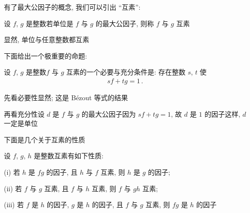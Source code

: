 有了最大公因子的概念, 我们可以引出 ``互素'':
\begin{definition}
    设 $f$, $g$ 是整数\period 若单位是 $f$ 与 $g$ 的最大公因子, 则称 $f$ 与 $g$ 互素 \period
\end{definition}

\begin{example}
    显然, 单位与任意整数都互素\period
\end{example}

下面给出一个极重要的命题:
\begin{proposition}
    设 $f$, $g$ 是整数\period $f$ 与 $g$ 互素的一个必要与充分条件是: 存在整数 $s$, $t$ 使
    \begin{align*}
        sf + tg = 1 \period
    \end{align*}
\end{proposition}

\begin{pf}
    先看必要性\period 显然; 这是 Bézout 等式的结果\period

    再看充分性\period 设 $d$ 是 $f$ 与 $g$ 的最大公因子\period 因为 $sf + tg = 1$, 故 $d$ 是 $1$ 的因子\period 这样, $d$ 一定是单位\period
\end{pf}

下面是几个关于互素的性质\period

\begin{proposition}
    设 $f$, $g$, $h$ 是整数\period 互素有如下性质:

    (i) 若 $h$ 是 $fg$ 的因子, 且 $h$ 与 $f$ 互素, 则 $h$ 是 $g$ 的因子;

    (ii) 若 $f$ 与 $g$ 互素, 且 $f$ 与 $h$ 互素, 则 $f$ 与 $gh$ 互素;

    (iii) 若 $f$ 是 $h$ 的因子, $g$ 是 $h$ 的因子, 且 $f$ 与 $g$ 互素, 则 $fg$ 是 $h$ 的因子\period
\end{proposition}

